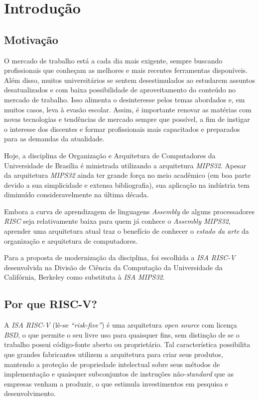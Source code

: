 \chapter{Introdução}\label{cap_intro}


\section{Motivação}
{
    O mercado de trabalho está a cada dia mais exigente, sempre buscando
    profissionais que conheçam as melhores e mais recentes ferramentas
    disponíveis. Além disso, muitos universitários se sentem desestimulados
    ao estudarem assuntos desatualizados e com baixa possibilidade de
    aproveitamento do conteúdo no mercado de trabalho. Isso alimenta o
    desinteresse pelos temas abordados e, em muitos casos, leva à evasão
    escolar. Assim, é importante renovar as matérias com novas tecnologias
    e tendências de mercado sempre que possível, a fim de instigar o
    interesse dos discentes e formar profissionais mais capacitados e
    preparados para as demandas da atualidade.
}

{
    Hoje, a disciplina de Organização e Arquitetura de Computadores da
    Universidade de Brasília é ministrada utilizando a arquitetura
    \textit{MIPS32}. Apesar da arquitetura \textit{MIPS32} ainda ter
    grande força no meio acadêmico (em boa parte devido a sua simplicidade
    e extensa bibliografia), sua aplicação na indústria tem diminuído
    consideravelmente na última década.
}

{
    Embora a curva de aprendizagem de linguagens \textit{Assembly} de
    alguns processadores \textit{RISC} seja relativamente baixa para quem
    já  conhece o \textit{Assembly MIPS32}, aprender uma arquitetura atual
    traz o benefício de conhecer o \textit{estado da arte} da organização e
    arquitetura de computadores.
}

{
    Para a proposta de modernização da disciplina, foi escolhida a
    \textit{ISA RISC-V} desenvolvida na Divisão de Ciência da Computação da
    Universidade da Califórnia, Berkeley como substituta à
    \textit{ISA MIPS32}.
}


\section{Por que RISC-V?}
{
    A \textit{ISA RISC-V} (lê-se \textit{``risk-five''}) é uma arquitetura
    \textit{open source} com licença \textit{BSD}, o que permite o seu
    livre uso para quaisquer fins, sem distinção de se o trabalho possui
    código-fonte aberto ou proprietário. Tal característica possibilita que
    grandes fabricantes utilizem a arquitetura para criar seus produtos,
    mantendo a proteção de propriedade intelectual sobre seus métodos de
    implementação e quaisquer subconjuntos de instruções
    não-\textit{standard} que as empresas venham a produzir, o que
    estimula investimentos em pesquisa e desenvolvimento.
}

